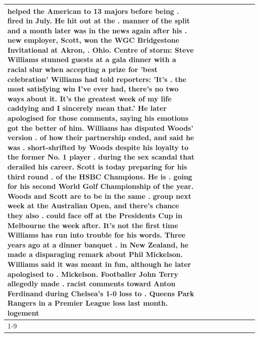\begin{table}[H]
\begin{tabular}{lllrlllll}
helped the American to 13 majors before being . fired in July. He hit out at the . manner of the split and a month later was in the news again after his . new employer, Scott, won the WGC Bridgestone Invitational at Akron, . Ohio. Centre of storm: Steve Williams stunned guests at a gala dinner with a racial slur when accepting a prize for 'best celebration' Williams had told reporters: 'It's . the most satisfying win I've ever had, there's no two ways about it. It's the greatest week of my life caddying and I sincerely mean that.' He later apologised for those comments, saying his emotions got the better of him. Williams has disputed Woods' version . of how their partnership ended, and said he was . short-shrifted by Woods despite his loyalty to the former No. 1 player . during the sex scandal that derailed his career. Scott is today preparing for his third round . of the HSBC Champions. He is . going for his second World Golf Championship of the year. Woods and Scott are to be in the same . group next week at the Australian Open, and there's chance they also . could face off at the Presidents Cup in Melbourne the week after. It's not the first time Williams has run into trouble for his words. Three years ago at a dinner banquet . in New Zealand, he made a disparaging remark about Phil Mickelson. Williams said it was meant in fun, although he later apologised to . Mickelson. Footballer John Terry allegedly made . racist comments toward Anton Ferdinand during Chelsea's 1-0 loss to . Queens Park Rangers in a Premier League loss last month. logement \\
\cline{1-9}

\end{tabular}
\end{table}
